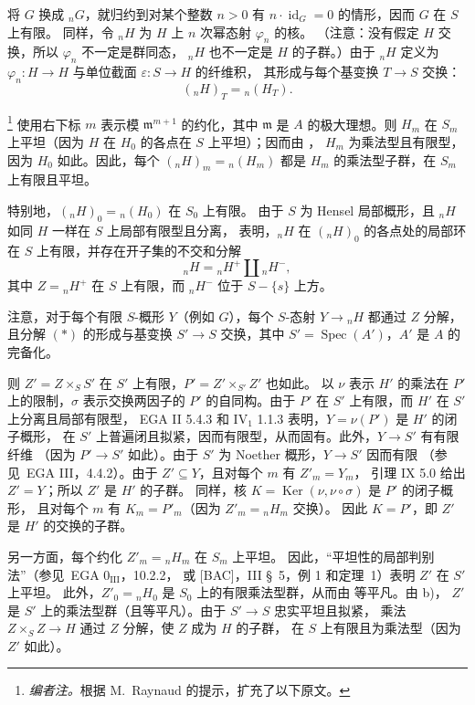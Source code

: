 将 \(G\) 换成 \({}_nG\)，就归约到对某个整数 \(n>0\) 有
\(n\cdot\operatorname{id}_G=0\) 的情形，因而 \(G\) 在 \(S\) 上有限。
同样，令 \({}_nH\) 为 \(H\) 上 \(n\) 次幂态射 \(\varphi_n\) 的核。
（注意：没有假定 \(H\) 交换，所以 \(\varphi_n\) 不一定是群同态，
\({}_nH\) 也不一定是 \(H\) 的子群。）由于 \({}_nH\) 定义为
\(\varphi_n:H\to H\) 与单位截面 \(\varepsilon:S\to H\) 的纤维积，
其形成与每个基变换 \(T\to S\) 交换：
\[
  ({}_nH)_T={}_n(H_T).
\]

\footnote{\textit{编者注。}根据 M.\ Raynaud 的提示，扩充了以下原文。}
使用右下标 \(m\) 表示模 \(\mathfrak m^{m+1}\) 的约化，其中 \(\mathfrak m\)
是 \(A\) 的极大理想。则 \(H_m\) 在 \(S_m\) 上平坦（因为 \(H\) 在
\(H_0\) 的各点在 \(S\) 上平坦）；因而由 ，
\(H_m\) 为乘法型且有限型，因为 \(H_0\) 如此。因此，每个
\(({}_nH)_m={}_n(H_m)\) 都是 \(H_m\) 的乘法型子群，在 \(S_m\) 上有限且平坦。

特别地，\(({}_nH)_0={}_n(H_0)\) 在 \(S_0\) 上有限。
由于 \(S\) 为 Hensel 局部概形，且 \({}_nH\) 如同 \(H\) 一样在 \(S\) 上局部有限型且分离，
 表明，\({}_nH\) 在
\(({}_nH)_0\) 的各点处的局部环在 \(S\) 上有限，并存在开子集的不交和分解
\[
  \tag{*}\label{sga3:x:lemma:4-3:equation:star}
  {}_nH={}_nH^+\amalg{}_nH^-,
\]
其中 \(Z={}_nH^+\) 在 \(S\) 上有限，而 \({}_nH^-\) 位于 \(S-\{s\}\) 上方。

注意，对于每个有限 \(S\)-概形 \(Y\)（例如 \(G\)），每个 \(S\)-态射
\(Y\to{}_nH\) 都通过 \(Z\) 分解，且分解 \((*)\) 的形成与基变换 \(S'\to S\)
交换，其中 \(S'=\operatorname{Spec}(A')\)，\(A'\) 是 \(A\) 的完备化。

则 \(Z'=Z\times_S S'\) 在 \(S'\) 上有限，\(P'=Z'\times_{S'}Z'\) 也如此。
以 \(\nu\) 表示 \(H'\) 的乘法在 \(P'\) 上的限制，\(\sigma\) 表示交换两因子的
\(P'\) 的自同构。由于 \(P'\) 在 \(S'\) 上有限，而 \(H'\) 在 \(S'\) 上分离且局部有限型，
EGA II 5.4.3 和 IV\(_1\) 1.1.3 表明，\(Y=\nu(P')\) 是 \(H'\) 的闭子概形，
在 \(S'\) 上普遍闭且拟紧，因而有限型，从而固有。此外，\(Y\to S'\) 有有限纤维
（因为 \(P'\to S'\) 如此）。由于 \(S'\) 为 Noether 概形，\(Y\to S'\) 因而有限
（参见\ EGA III，4.4.2）。由于 \(Z'\subseteq Y\)，且对每个 \(m\) 有 \(Z'_m=Y_m\)，
引理 IX 5.0 给出 \(Z'=Y\)；所以 \(Z'\) 是 \(H'\) 的子群。
同样，核 \(K=\operatorname{Ker}(\nu,\nu\circ\sigma)\) 是 \(P'\) 的闭子概形，
且对每个 \(m\) 有 \(K_m=P'_m\)（因为 \(Z'_m={}_nH_m\) 交换）。
因此 \(K=P'\)，即 \(Z'\) 是 \(H'\) 的交换的子群。

另一方面，每个约化 \(Z'_m={}_nH_m\) 在 \(S_m\) 上平坦。
因此，“平坦性的局部判别法”（参见\ EGA \(0_{\mathrm{III}}\)，10.2.2，
或 [BAC]，III \S~5，例 1 和定理~1）表明 \(Z'\) 在 \(S'\) 上平坦。
此外，\(Z'_0={}_nH_0\) 是 \(S_0\) 上的有限乘法型群，从而由
 等平凡。由  b)，
\(Z'\) 是 \(S'\) 上的乘法型群（且等平凡）。由于 \(S'\to S\) 忠实平坦且拟紧，
乘法 \(Z\times_S Z\to H\) 通过 \(Z\) 分解，使 \(Z\) 成为 \(H\) 的子群，
在 \(S\) 上有限且为乘法型（因为 \(Z'\) 如此）。


